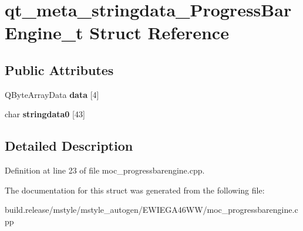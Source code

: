 \hypertarget{structqt__meta__stringdata___progress_bar_engine__t}{}\section{qt\+\_\+meta\+\_\+stringdata\+\_\+\+Progress\+Bar\+Engine\+\_\+t Struct Reference}
\label{structqt__meta__stringdata___progress_bar_engine__t}
\subsection*{Public Attributes}
\begin{DoxyCompactItemize}
\item 
\mbox{\label{structqt__meta__stringdata___progress_bar_engine__t_a6ed2cb81c11413a0e2725cb96957da92}} 
Q\+Byte\+Array\+Data {\bfseries data} \mbox{[}4\mbox{]}
\item 
\mbox{\label{structqt__meta__stringdata___progress_bar_engine__t_a4eeec5c41bbee696369c50803d4e321e}} 
char {\bfseries stringdata0} \mbox{[}43\mbox{]}
\end{DoxyCompactItemize}


\subsection{Detailed Description}


Definition at line 23 of file moc\+\_\+progressbarengine.\+cpp.



The documentation for this struct was generated from the following file\+:\begin{DoxyCompactItemize}
\item 
build.\+release/mstyle/mstyle\+\_\+autogen/\+E\+W\+I\+E\+G\+A46\+W\+W/moc\+\_\+progressbarengine.\+cpp\end{DoxyCompactItemize}
